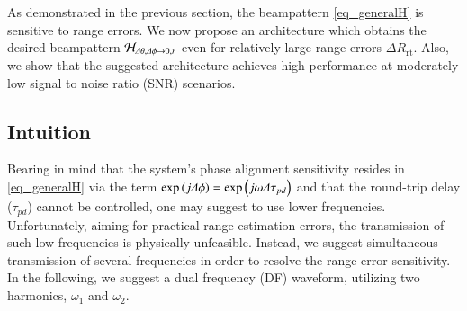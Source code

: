 As demonstrated in the previous section, the beampattern \eqref{eq_generalH} is sensitive to range errors.
We now propose an architecture which obtains the desired beampattern $\mathcal{H}_{\Delta\theta,\Delta\phi\to0,r}$ even for relatively large range errors $\Delta R_{\text{rt}}$. Also, we show that the suggested architecture achieves high performance at moderately low signal to noise ratio (SNR) scenarios.

\subsection*{Intuition}
Bearing in mind that the system's phase alignment sensitivity resides in \eqref{eq_generalH} via the  term $\exp\Brack{j\dPhi}=\exp\Brack{j\omega\Delta\tau_{pd}}$ and that the round-trip delay ($\tau_{pd}$) cannot be controlled, one may suggest to use lower frequencies. 
Unfortunately, aiming for practical range estimation errors, the transmission of such low frequencies is physically unfeasible. 
Instead, we suggest simultaneous transmission of several frequencies in order to resolve the range error sensitivity. In the following, we suggest a dual frequency (DF) waveform, utilizing two harmonics, $\omega_1$ and $\omega_2$.

